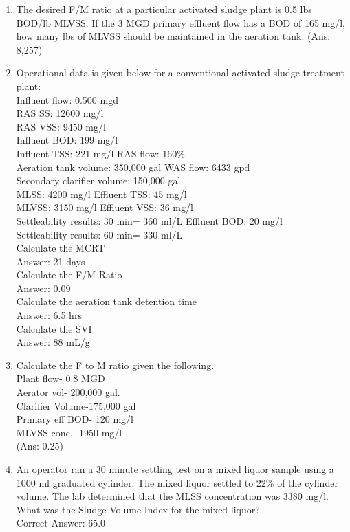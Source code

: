 \begin{enumerate}
\item The desired F/M ratio at a particular activated sludge plant is 0.5 lbs BOD/lb MLVSS.  If the 3 MGD primary effluent flow has a BOD of 165 mg/l, how many lbs of MLVSS should be maintained in the aeration tank. (Ans: 8,257) \\

\item Operational data is given below for a conventional activated sludge treatment plant:\\
Influent flow: 0.500 mgd \\
RAS SS: 12600 mg/l\\
RAS VSS: 9450 mg/l\\
Influent BOD: 199 mg/l \\
Influent TSS: 221 mg/l RAS flow: 160\%\\
Aeration tank volume: 350,000 gal WAS flow: 6433 gpd\\
Secondary clarifier volume: 150,000 gal\\
MLSS: 4200 mg/l Effluent TSS: 45 mg/l\\
MLVSS: 3150 mg/l Effluent VSS: 36 mg/l\\
Settleability results: 30 min= 360 ml/L Effluent BOD: 20 mg/l\\
Settleability results: 60 min= 330 ml/L\\
Calculate the MCRT \\
Answer: 21 days\\
Calculate the F/M Ratio \\
Answer: 0.09\\
Calculate the aeration tank detention time \\
Answer: 6.5 hrs\\
Calculate the SVI \\
Answer: 88 mL/g\\

\item Calculate the F to M ratio given the following.\\
Plant flow- 0.8 MGD\\
Aerator vol- 200,000 gal.\\
Clarifier Volume-175,000 gal\\
Primary eff BOD- 120 mg/l\\
MLVSS conc. -1950 mg/l\\
(Ans:  0.25)\\

\item An operator ran a 30 minute settling test on a mixed liquor sample using a 1000 ml graduated cylinder. The mixed liquor settled to 22\% of the cylinder volume. The lab determined that the MLSS concentration was 3380 mg/l. What was the Sludge Volume Index for the mixed liquor? \\
Correct Answer:  65.0\\




\end{enumerate}
